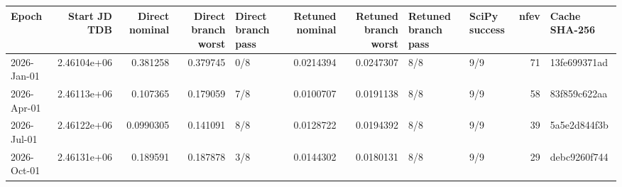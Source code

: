 \begin{tabular}{lrrrlrrllrl}
\toprule
Epoch & Start JD TDB & Direct nominal & Direct branch worst & Direct branch pass & Retuned nominal & Retuned branch worst & Retuned branch pass & SciPy success & nfev & Cache SHA-256 \\
\midrule
2026-Jan-01 & 2.46104e+06 & 0.381258 & 0.379745 & 0/8 & 0.0214394 & 0.0247307 & 8/8 & 9/9 & 71 & 13fe699371ad \\
2026-Apr-01 & 2.46113e+06 & 0.107365 & 0.179059 & 7/8 & 0.0100707 & 0.0191138 & 8/8 & 9/9 & 58 & 83f859c622aa \\
2026-Jul-01 & 2.46122e+06 & 0.0990305 & 0.141091 & 8/8 & 0.0128722 & 0.0194392 & 8/8 & 9/9 & 39 & 5a5e2d844f3b \\
2026-Oct-01 & 2.46131e+06 & 0.189591 & 0.187878 & 3/8 & 0.0144302 & 0.0180131 & 8/8 & 9/9 & 29 & debc9260f744 \\
\bottomrule
\end{tabular}
